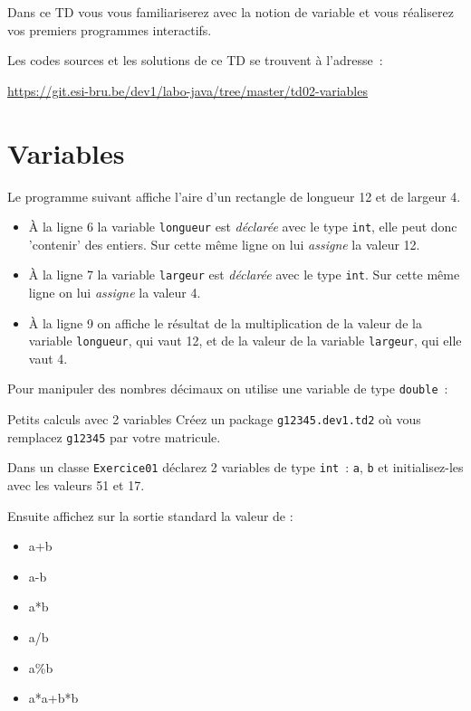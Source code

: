 \documentclass[a4paper,11pt]{article}
\date{2018 -- 2019}
\newcommand{\publicbasepath}
{https://git.esi-bru.be/dev1/labo-java/tree/master/td02-variables}
\begin{document}
\entete
\titre

\lastedit


	Dans ce TD vous vous familiariserez avec la notion de variable et vous 
	réaliserez vos premiers programmes interactifs.

	Les codes sources et les solutions de ce TD se trouvent à l'adresse~: 
	
	\url{\publicbasepath}	
	
	\tableofcontents

	\newpage
	
\section{Variables}

	Le programme suivant affiche l'aire d'un rectangle de longueur 12 et de largeur 4.
	

	\begin{itemize}
		\item \`A la ligne 6 la variable \texttt{longueur} est \emph{déclarée} 
			avec le type \texttt{int}, elle peut donc 'contenir' des entiers. 
			Sur cette même ligne on lui \emph{assigne} la valeur 12.  

		\item \`A la ligne 7 la variable \texttt{largeur} est \emph{déclarée} avec le type \texttt{int}. 
			Sur cette même ligne on lui \emph{assigne} la valeur 4.
	
		\item \`A la ligne 9 on affiche le résultat de la multiplication de la valeur de la variable \texttt{longueur}, 
			qui vaut 12, et de la valeur de la variable \texttt{largeur}, qui elle vaut 4.  
  	\end{itemize}

	Pour manipuler des nombres décimaux on utilise une variable de type 
	\texttt{double}~:
	




	\begin{Exercice}{Petits calculs avec 2 variables} 		
		Créez un package \texttt{g12345.dev1.td2} où vous remplacez \texttt{g12345} par 
		votre matricule.

		Dans un classe \texttt{Exercice01} déclarez 2 variables de type \texttt{int}~: 
		\texttt{a}, \texttt{b} et initialisez-les avec les valeurs 51 et 17.
		
		Ensuite affichez sur la sortie standard la valeur de :
		\begin{itemize}
		 	\item a+b
			\item a-b
			\item a*b
			\item a/b
			\item a\%b
			\item a*a+b*b
		\end{itemize} 
	\end{Exercice}
\end{document}
